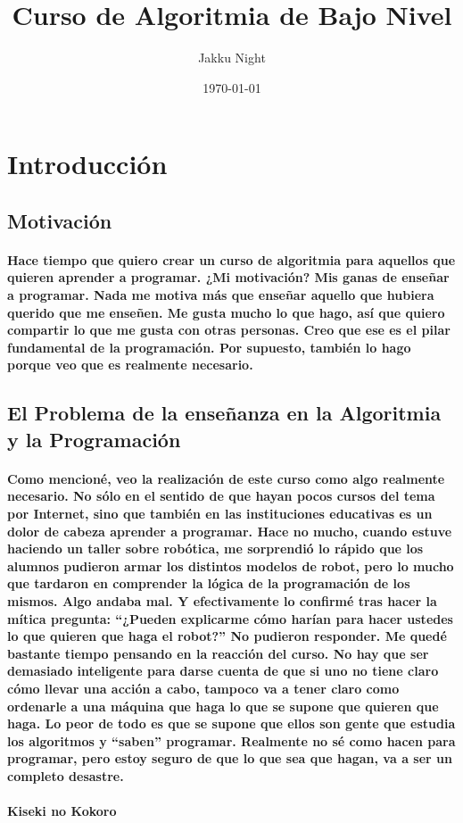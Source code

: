 \documentclass[a4paper, 10pt]{article}
\title{Curso de Algoritmia de Bajo Nivel}
\author{Jakku Night}
\date{\today}
\begin{document}
    \maketitle
    \newpage
    \section*{Introducción}
    \subsection*{Motivación}
    \paragraph{
        Hace tiempo que quiero crear un curso de algoritmia para aquellos que quieren aprender a programar. 
        ¿Mi motivación? Mis ganas de enseñar a programar. Nada me motiva más que enseñar aquello que hubiera querido que me enseñen. 
        Me gusta mucho lo que hago, así que quiero compartir lo que me gusta con otras personas. Creo que ese es el pilar fundamental de 
        la programación. Por supuesto, también lo hago porque veo que es realmente necesario.
    }
    \subsection*{El Problema de la enseñanza en la Algoritmia y la Programación}
    \paragraph{
        Como mencioné, veo la realización de este curso como algo realmente necesario. No sólo en el sentido de que hayan pocos cursos 
        del tema por Internet, sino que también en las instituciones educativas es un dolor de cabeza aprender a programar. Hace no mucho, 
        cuando estuve haciendo un taller sobre robótica, me sorprendió lo rápido que los alumnos pudieron armar los distintos modelos de robot, 
        pero lo mucho que tardaron en comprender la lógica de la programación de los mismos. Algo andaba mal. Y efectivamente lo confirmé tras 
        hacer la mítica pregunta: ``¿Pueden explicarme cómo harían para hacer ustedes lo que quieren que haga el robot?'' No pudieron responder. 
        Me quedé bastante tiempo pensando en la reacción del curso. No hay que ser demasiado inteligente para darse cuenta de que si uno 
        no tiene claro cómo llevar una acción a cabo, tampoco va a tener claro como ordenarle a una máquina que haga lo que se supone que quieren 
        que haga. Lo peor de todo es que se supone que ellos son gente que estudia los algoritmos y ``saben'' programar. Realmente no sé como 
        hacen para programar, pero estoy seguro de que lo que sea que hagan, va a ser un completo desastre.
    }
    \paragraph{
        Kiseki no Kokoro
    }
\end{document}
